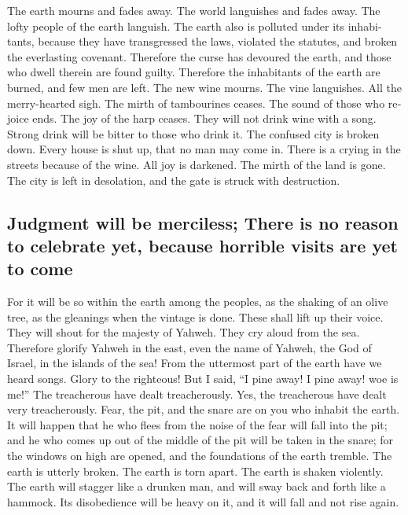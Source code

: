 \begin{paracol}{2}
\begin{otherlanguage}{english}
 The earth mourns and fades away. The world languishes and
fades away. The lofty people of the earth languish.  The
earth also is polluted under its inhabitants, because they have
transgressed the laws, violated the statutes, and broken the everlasting
covenant.  Therefore the curse has devoured the earth, and
those who dwell therein are found guilty. Therefore the inhabitants of
the earth are burned, and few men are left.  The new wine
mourns. The vine languishes. All the merry-hearted sigh. 
The mirth of tambourines ceases. The sound of those who rejoice ends.
The joy of the harp ceases.  They will not drink wine with
a song. Strong drink will be bitter to those who drink it.
 The confused city is broken down. Every house is shut
up, that no man may come in.  There is a crying in the
streets because of the wine. All joy is darkened. The mirth of the land
is gone.  The city is left in desolation, and the gate is
struck with destruction.

\hypertarget{judgment-will-be-merciless-there-is-no-reason-to-celebrate-yet-because-horrible-visits-are-yet-to-come}{%
\subsection{Judgment will be merciless; There is no reason to celebrate
yet, because horrible visits are yet to
come}\label{judgment-will-be-merciless-there-is-no-reason-to-celebrate-yet-because-horrible-visits-are-yet-to-come}}

 For it will be so within the earth among the peoples, as
the shaking of an olive tree, as the gleanings when the vintage is done.
 These shall lift up their voice. They will shout for the
majesty of Yahweh. They cry aloud from the sea. 
Therefore glorify Yahweh in the east, even the name of Yahweh, the God
of Israel, in the islands of the sea!  From the uttermost
part of the earth have we heard songs. Glory to the righteous! But I
said, ``I pine away! I pine away! woe is me!'' The treacherous have
dealt treacherously. Yes, the treacherous have dealt very treacherously.
 Fear, the pit, and the snare are on you who inhabit the
earth.  It will happen that he who flees from the noise
of the fear will fall into the pit; and he who comes up out of the
middle of the pit will be taken in the snare; for the windows on high
are opened, and the foundations of the earth tremble. 
The earth is utterly broken. The earth is torn apart. The earth is
shaken violently.  The earth will stagger like a drunken
man, and will sway back and forth like a hammock. Its disobedience will
be heavy on it, and it will fall and not rise again.


\end{otherlanguage}
\end{paracol}
